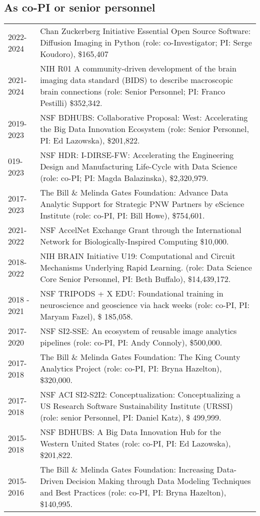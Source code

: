 \documentclass[11pt,fullpage]{article}
\begin{document}
\subsection*{As co-PI or senior personnel}
\begin{tabular}{p{}p{}}
2022-2024 & Chan Zuckerberg Initiative Essential Open Source Software: Diffusion Imaging in Python (role: co-Investigator; PI: Serge Koudoro), \$165,407\\
2021-2024 & NIH R01 A community-driven development of the brain imaging data standard (BIDS) to describe macroscopic brain connections (role: Senior Personnel; PI: Franco Pestilli) \$352,342. \\
2019-2023 & NSF BDHUBS: Collaborative Proposal: West: Accelerating the Big Data Innovation Ecosystem (role: Senior Personnel, PI: Ed Lazowska), \$201,822.\\
019-2023 & NSF HDR: I-DIRSE-FW: Accelerating the Engineering Design and Manufacturing Life-Cycle with Data Science (role: co-PI; PI: Magda Balazinska), \$2,320,979. \\
2017-2023 & The Bill \& Melinda Gates Foundation: Advance Data Analytic Support for Strategic PNW Partners by eScience Institute (role: co-PI, PI: Bill Howe), \$754,601. \\
2021-2022 & NSF AccelNet Exchange Grant through the International Network for Biologically-Inspired Computing \$10,000.\\
2018-2022 & NIH BRAIN Initiative U19: Computational and Circuit Mechanisms Underlying Rapid Learning. (role: Data Science Core Senior Personnel, PI: Beth Buffalo), \$14,439,172. \\
2018 - 2021 & NSF TRIPODS + X EDU: Foundational training in neuroscience and geoscience via hack weeks (role: co-PI, PI: Maryam Fazel), \$ 185,058. \\
2017-2020 & NSF SI2-SSE: An ecosystem of reusable image analytics pipelines (role: co-PI, PI: Andy Connoly), \$500,000. \\
2017-2018 & The Bill \& Melinda Gates Foundation: The King County Analytics Project (role: co-PI, PI: Bryna Hazelton), \$320,000. \\
2017-2018 & NSF ACI SI2-S2I2: Conceptualization: Conceptualizing a US Research Software Sustainability Institute (URSSI) (role: senior Personnel, PI: Daniel Katz), \$ 499,999.\\
2015-2018 & NSF BDHUBS: A Big Data Innovation Hub for the Western United States (role: co-PI, PI: Ed Lazowska), \$201,822.\\
2015-2016 & The Bill \& Melinda Gates Foundation: Increasing Data-Driven Decision Making through Data Modeling Techniques and Best Practices (role: co-PI, PI: Bryna Hazelton), \$140,995. \\
\end{tabular}
\end{document}
